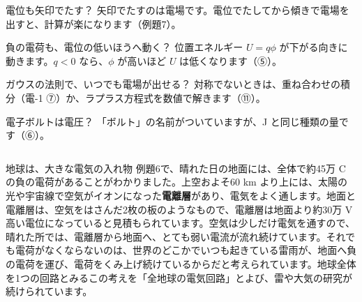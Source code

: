 \begin{tsumazuki}{電位も矢印でたす？}
矢印でたすのは電場です。電位でたしてから傾きで電場を出すと、計算が楽になります（例題7）。
\end{tsumazuki}

\begin{tsumazuki}{負の電荷も、電位の低いほうへ動く？}
位置エネルギー $U=q\phi$ が下がる向きに動きます。$q<0$ なら、$\phi$ が高いほど $U$ は低くなります（⑤）。
\end{tsumazuki}

\begin{tsumazuki}{ガウスの法則で、いつでも電場が出せる？}
対称でないときは、重ね合わせの積分（電-1 ⑦）か、ラプラス方程式を数値で解きます（⑪）。
\end{tsumazuki}

\begin{tsumazuki}{電子ボルトは電圧？}
「ボルト」の名前がついていますが、J と同じ種類の量です（⑥）。
\end{tsumazuki}

\begin{column}{地球は、大きな電気の入れ物}
例題6で、晴れた日の地面には、全体で約45万 C の負の電荷があることがわかりました。上空およそ60 km より上には、太陽の光や宇宙線で空気がイオンになった\textbf{電離層}があり、電気をよく通します。地面と電離層は、空気をはさんだ2枚の板のようなもので、電離層は地面より約30万 V 高い電位になっていると見積もられています。空気は少しだけ電気を通すので、晴れた所では、電離層から地面へ、とても弱い電流が流れ続けています。それでも電荷がなくならないのは、世界のどこかでいつも起きている雷雨が、地面へ負の電荷を運び、電荷をくみ上げ続けているからだと考えられています。地球全体を1つの回路とみるこの考えを「全地球の電気回路」とよび、雷や大気の研究が続けられています。
\end{column}

